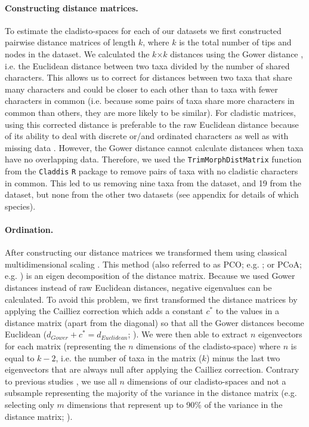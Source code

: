 \documentclass[12pt,a4paper]{article}
\begin{document}
\paragraph{Constructing distance matrices.}
To estimate the cladisto-spaces for each of our datasets we first constructed pairwise distance matrices of length $k$, where $k$ is the total number of tips and nodes in the dataset.
We calculated the $k$$\times$$k$ distances using the Gower distance \citep{Gower71}, i.e. the Euclidean distance between two taxa divided by the number of shared characters. 
This allows us to correct for distances between two taxa that share many characters and could be closer to each other than to taxa with fewer characters in common (i.e. because some pairs of taxa share more characters in common than others, they are more likely to be similar).
For cladistic matrices, using this corrected distance is preferable to the raw Euclidean distance because of its ability to deal with discrete or/and ordinated characters as well as with missing data \citep{anderson2012using}.
However, the Gower distance cannot calculate distances when taxa have no overlapping data.
Therefore, we used the \texttt{TrimMorphDistMatrix} function from the \texttt{Claddis} \texttt{R} package \citep{Claddis} to remove pairs of taxa with no cladistic characters in common.
This led to us removing nine taxa from the \cite{bapst2016topology} dataset, and 19 from the \cite{brusatte2014gradual} dataset, but none from the other two datasets (see appendix for details of which species). %

\paragraph{Ordination.}
After constructing our distance matrices we transformed them using classical multidimensional scaling \citep[MDS;][]{torgerson1965multidimensional,GOWER01121966,cailliez1983analytical}.
This method (also referred to as PCO; e.g. \citealt{Brusatte2015}; or PCoA; e.g. \citealt{paradisape:2004}) is an eigen decomposition of the distance matrix.
Because we used Gower distances instead of raw Euclidean distances, negative eigenvalues can be calculated.
To avoid this problem, we first transformed the distance matrices by applying the Cailliez correction \citep{cailliez1983analytical} which adds a constant $c^*$ to the values in a distance matrix (apart from the diagonal) so that all the Gower distances become Euclidean ($d_{Gower}+c^*=d_{Euclidean}$; \citealt{cailliez1983analytical}). 
We were then able to extract $n$ eigenvectors for each matrix (representing the $n$ dimensions of the cladisto-space) where $n$ is equal to $k-2$, i.e. the number of taxa in the matrix ($k$) minus the last two eigenvectors that are always null after applying the Cailliez correction.
Contrary to previous studies \citep[e.g][]{brusatte50,cisneros2010,prentice2011,anderson2012using,Hughes20082013,bentonmodels2014}, we use all $n$ dimensions of our cladisto-spaces and not a subsample representing the majority of the variance in the distance matrix (e.g. selecting only $m$ dimensions that represent up to 90\% of the variance in the distance matrix; \citealt{Brusatte12092008,toljagictriassic-jurassic2013}).
\end{document}
